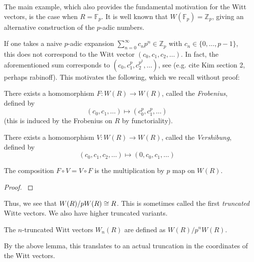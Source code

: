 The main example, which also provides the fundamental motivation
for the Witt vectors, is the case when \(R = \mathbb{F}_{p}\).
It is well known that \(W(\mathbb{F}_{p}) = \mathbb{Z}_{p}\), 
giving an alternative construction of the \(p\)-adic numbers.

\begin{warn}
	If one takes a
    naive \(p\)-adic expansion 
    \(\sum_{n = 0}^{\infty} c_{n}p^{n} \in \mathbb{Z}_{p}\)
    with \(c_{n} \in \{0, \ldots, p-1\}\), this does not correspond
    to the Witt vector \((c_{0}, c_{1}, c_{2}, \ldots)\).
    In fact, the aforementioned sum corresponds to 
    \((c_{0}, c_{1}^{p}, c_{2}^{p^{2}}, \ldots)\), see
    (e.g. cite Kim section 2, perhaps rabinoff). 
    This motivates the following, which we recall without proof:
\end{warn}


\begin{defn}
	There exists a homomorphism \(F \colon W(R) \xrightarrow{} W(R)\),
	called the \textit{Frobenius},
	defined by
	\[
	 (c_{0}, c_{1}, \ldots) \mapsto (c_{0}^{p}, c_{1}^{p}, \ldots)
	\] 
	(this is induced by the Frobenius on \(R\) by functoriality).
\end{defn}

\begin{defn}
	There exists a homomorphism \(V \colon W(R) \xrightarrow{} W(R)\),
	called the \textit{Vershibung},
	defined by
	\[
		(c_{0}, c_{1}, c_{2}, \ldots) \mapsto  (0, c_{0}, c_{1}, \ldots)
	\] 
\end{defn}

\begin{lem}
	The composition \(F \circ V = V \circ F\) is the multiplication by
	\(p\) map on \(W(R)\).
\end{lem}

\begin{proof}
	\cite[Proposition~5]{kim-2017-witt-vec}
\end{proof}

Thus, we see that \(W(R) / pW(R) \cong R\).
This is sometimes called the first \textit{truncated}
Witte vectors.
We also have higher truncated variants.

\begin{defn}
	The \(n\)-truncated Witt vectors
	\(W_{n}(R)\) are defined as
	\(W(R) / p^{n}W(R)\).
\end{defn}

By the above lemma, this translates to an actual truncation
in the coordinates of the Witt vectors.

